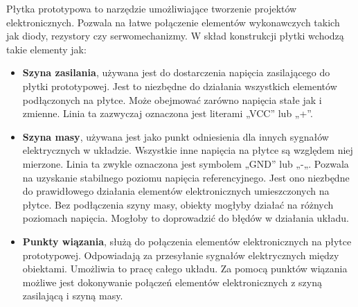 Płytka prototypowa to narzędzie umożliwiające tworzenie projektów elektronicznych. Pozwala na łatwe połączenie elementów wykonawczych takich jak diody, rezystory czy serwomechanizmy. W skład konstrukcji płytki wchodzą takie elementy jak:
\begin{itemize}  
	\item \textbf{Szyna zasilania}, używana jest do dostarczenia napięcia zasilającego do płytki prototypowej. Jest to niezbędne do działania wszystkich elementów podłączonych na płytce.
Może obejmować zarówno napięcia stałe jak i zmienne. Linia ta zazwyczaj oznaczona jest literami „VCC” lub „+”. 
	\item \textbf{Szyna masy}, używana jest jako punkt odniesienia dla innych sygnałów elektrycznych w układzie. Wszystkie inne napięcia na płytce są względem niej mierzone. Linia ta zwykle oznaczona jest symbolem „GND” lub „-„. Pozwala na uzyskanie stabilnego poziomu napięcia referencyjnego. Jest ono niezbędne do prawidłowego działania elementów elektronicznych umieszczonych na płytce. Bez podłączenia szyny masy, obiekty mogłyby działać na różnych poziomach napięcia. Mogłoby to doprowadzić do błędów w działania układu.
	\\
\item \textbf{Punkty wiązania}, służą do połączenia elementów elektronicznych na płytce prototypowej. Odpowiadają za przesyłanie sygnałów elektrycznych między obiektami. Umożliwia to pracę całego układu. Za pomocą punktów wiązania możliwe jest dokonywanie połączeń elementów elektronicznych z szyną zasilającą i szyną masy.


\end{itemize}




